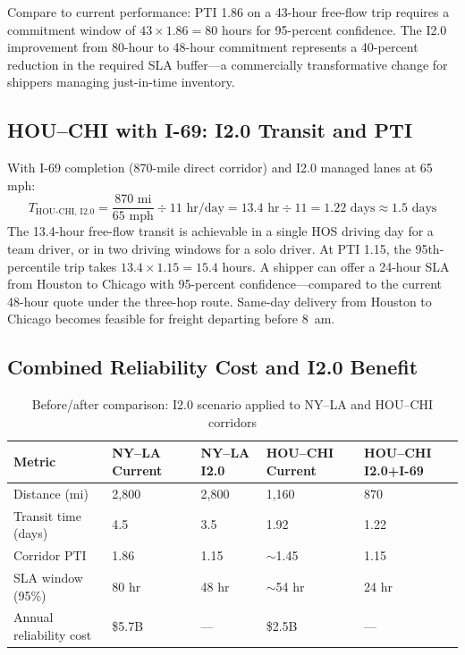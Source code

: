Compare to current performance: PTI 1.86 on a 43-hour free-flow trip requires a commitment window of $43 \times 1.86 = 80$ hours for 95-percent confidence. The I2.0 improvement from 80-hour to 48-hour commitment represents a 40-percent reduction in the required SLA buffer---a commercially transformative change for shippers managing just-in-time inventory.

\subsection{HOU--CHI with I-69: I2.0 Transit and PTI}

With I-69 completion (870-mile direct corridor) and I2.0 managed lanes at 65 mph:
\begin{equation}
  T_{\text{HOU-CHI, I2.0}} = \frac{870 \text{ mi}}{65 \text{ mph}} \div 11 \text{ hr/day} = 13.4 \text{ hr} \div 11 = 1.22 \text{ days} \approx 1.5 \text{ days}
\end{equation}
The 13.4-hour free-flow transit is achievable in a single HOS driving day for a team driver, or in two driving windows for a solo driver. At PTI 1.15, the 95th-percentile trip takes $13.4 \times 1.15 = 15.4$ hours. A shipper can offer a 24-hour SLA from Houston to Chicago with 95-percent confidence---compared to the current 48-hour quote under the three-hop route. Same-day delivery from Houston to Chicago becomes feasible for freight departing before 8~am.

\subsection{Combined Reliability Cost and I2.0 Benefit}

\begin{table}[ht]
\centering
\caption{Before/after comparison: I2.0 scenario applied to NY--LA and HOU--CHI corridors}
\label{tab:i2_comparison}
\begin{tabular}{lllll}
\toprule
Metric & NY--LA Current & NY--LA I2.0 & HOU--CHI Current & HOU--CHI I2.0+I-69 \\
\midrule
Distance (mi)          & 2,800 & 2,800 & 1,160 & 870 \\
Transit time (days)    & 4.5   & 3.5   & 1.92  & 1.22 \\
Corridor PTI           & 1.86  & 1.15  & $\sim$1.45 & 1.15 \\
SLA window (95\%)      & 80 hr & 48 hr & $\sim$54 hr & 24 hr \\
Annual reliability cost & \$5.7B & --- & \$2.5B & --- \\
\bottomrule
\end{tabular}
\end{table}

